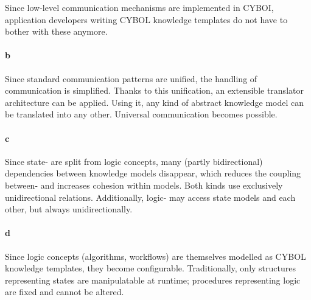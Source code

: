 Since low-level communication mechanisms are implemented in CYBOI,
application developers writing CYBOL knowledge templates do not have to bother
with these anymore.

\paragraph{b}

Since standard communication patterns are unified, the handling of
communication is simplified. Thanks to this unification, an extensible
translator architecture can be applied. Using it, any kind of abstract
knowledge model can be translated into any other. Universal communication
becomes possible.

\paragraph{c}

Since state- are split from logic concepts, many (partly bidirectional)
dependencies between knowledge models disappear, which reduces the coupling
between- and increases cohesion within models. Both kinds use exclusively
unidirectional relations. Additionally, logic- may access state models and each
other, but always unidirectionally.

\paragraph{d}

Since logic concepts (algorithms, workflows) are themselves modelled as CYBOL
knowledge templates, they become configurable. Traditionally, only structures
representing states are manipulatable at runtime; procedures representing logic
are fixed and cannot be altered.
